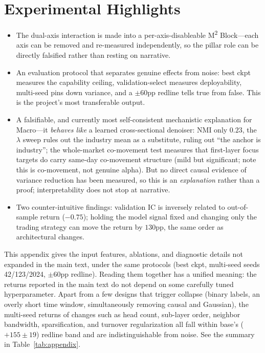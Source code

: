 \documentclass[a4paper,11pt]{article}
\newcommand{\msq}{\texorpdfstring{M\textsuperscript{2}}{M2}}             %
\begin{document}
\section*{Experimental Highlights}
\begin{itemize}
  \item The dual-axis interaction is made into a per-axis-disableable \msq{}
        Block---each axis can be removed and re-measured independently, so the
        pillar role can be directly falsified rather than resting on narrative.
  \item An evaluation protocol that separates genuine effects from noise: best
        ckpt measures the capability ceiling, validation-select measures
        deployability, multi-seed pins down variance, and a $\pm60$pp redline
        tells true from false. This is the project's most transferable output.
  \item A falsifiable, and currently most self-consistent mechanistic
        explanation for Macro---it \emph{behaves like} a learned cross-sectional
        denoiser: NMI only $0.23$, the $\lambda$ sweep rules out the industry
        mean as a substitute, ruling out ``the anchor is industry''; the
        whole-market co-movement test measures that first-layer focus targets
        do carry same-day co-movement structure (mild but significant; note
        this is co-movement, not genuine alpha). But no direct causal evidence
        of variance reduction has been measured, so this is an
        \emph{explanation} rather than a proof; interpretability does not stop
        at narrative.
  \item Two counter-intuitive findings: validation IC is inversely related to
        out-of-sample return ($-0.75$); holding the model signal fixed and
        changing only the trading strategy can move the return by $130$pp, the
        same order as architectural changes.
\end{itemize}

\appendix

This appendix gives the input features, ablations, and diagnostic details not
expanded in the main text, under the same protocols (best ckpt, multi-seed
seeds 42/123/2024, $\pm60$pp redline). Reading them together has a unified
meaning: the returns reported in the main text do not depend on some carefully
tuned hyperparameter. Apart from a few designs that trigger collapse (binary
labels, an overly short time window, simultaneously removing causal and
Gaussian), the multi-seed returns of changes such as head count, sub-layer
order, neighbor bandwidth, sparsification, and turnover regularization all fall
within base's ($+155\pm19$) redline band and are indistinguishable from noise.
See the summary in Table~\ref{tab:appendix}.
\end{document}
